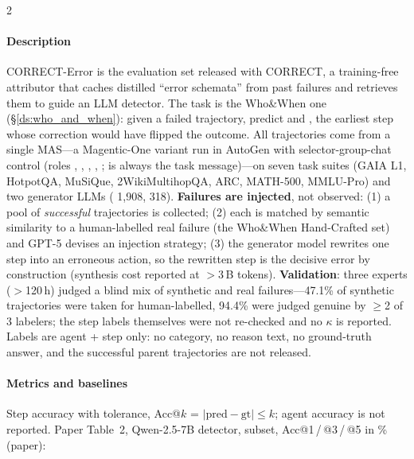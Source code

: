 \begin{multicols}{2}
\paragraph{Description} CORRECT-Error is the evaluation set released with CORRECT, a training-free attributor that caches distilled ``error schemata'' from past failures and retrieves them to guide an LLM detector. The task is the Who\&When one (\S\ref{ds:who_and_when}): given a failed trajectory, predict  and , the earliest step whose correction would have flipped the outcome. All trajectories come from a single MAS---a Magentic-One variant run in AutoGen with selector-group-chat control (roles , , , , ;  is always the  task message)---on seven task suites (GAIA L1, HotpotQA, MuSiQue, 2WikiMultihopQA, ARC, MATH-500, MMLU-Pro) and two generator LLMs ( 1,908,  318). \textbf{Failures are injected}, not observed: (1) a pool of \emph{successful} trajectories is collected; (2) each is matched by semantic similarity to a human-labelled real failure (the Who\&When Hand-Crafted set) and GPT-5 devises an injection strategy; (3) the generator model rewrites one step into an erroneous action, so the rewritten step is the decisive error by construction (synthesis cost reported at $>$3\,B tokens). \textbf{Validation}: three experts ($>$120\,h) judged a blind mix of synthetic and real failures---47.1\% of synthetic trajectories were taken for human-labelled, 94.4\% were judged genuine by $\ge$2 of 3 labelers; the step labels themselves were not re-checked and no $\kappa$ is reported. Labels are agent + step only: no category, no reason text, no ground-truth answer, and the successful parent trajectories are not released.

\paragraph{Metrics and baselines} Step accuracy with tolerance, Acc@$k$ = $|\text{pred}-\text{gt}|\le k$; agent accuracy is not reported. Paper Table~2, Qwen-2.5-7B detector,  subset, Acc@1\,/\,@3\,/\,@5 in \% (paper):


\end{multicols}
